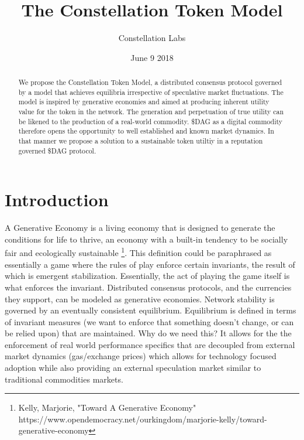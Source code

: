 \documentclass{article}
\title{The Constellation Token Model}
\author{Constellation Labs}
\date{June 9 2018}
\begin{document}
\maketitle

\begin{abstract}
We propose the Constellation Token Model, a distributed consensus protocol governed by a model that achieves equilibria irrespective of speculative market fluctuations. The model is inspired by generative economies and aimed at producing inherent utility value for the token in the network. The generation and perpetuation of true utility can be likened to the production of a real-world commodity. \$DAG as a digital commodity therefore opens the opportunity to well established and known market dynamics. In that manner we propose a solution to a sustainable token utiltiy in a reputation governed \$DAG protocol. 
\end{abstract}
\setcounter{secnumdepth}{0}
\section{Introduction}
A Generative Economy is a living economy that is designed to generate the conditions for life to thrive, an economy with a built-in tendency to be socially fair and ecologically sustainable \footnote{Kelly, Marjorie, "Toward A Generative Economy" https://www.opendemocracy.net/ourkingdom/marjorie-kelly/toward-generative-economy}. This definition could be paraphrased as essentially a game where the rules of play enforce certain invariants, the result of which is emergent stabilization. Essentially, the act of playing the game itself is what enforces the invariant. Distributed consensus protocols, and the currencies they support, can be modeled as generative economies. Network stability is governed by an eventually consistent equilibrium. Equilibrium is defined in terms of invariant measures (we want to enforce that something doesn't change, or can be relied upon) that are maintained. Why do we need this? It allows for the the enforcement of real world performance specifics that are decoupled from external market dynamics (gas/exchange prices) which allows for technology focused adoption while also providing an external speculation market similar to traditional commodities markets.
\end{document}
